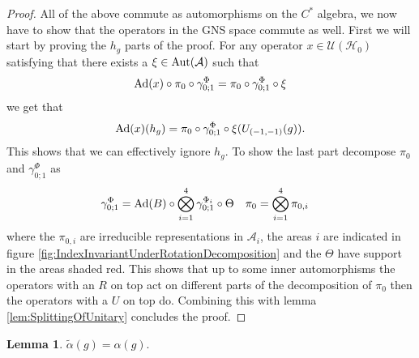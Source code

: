 \documentclass[12pt,a4paper,twoside]{article}
\let\originalleft\left
\let\originalright\right
\renewcommand{\left}{\mathopen{}\mathclose\bgroup\originalleft}
\renewcommand{\right}{\aftergroup\egroup\originalright}
\newcommand{\UU}{\mathcal U}
\newcommand{\HH}{\mathcal H}
\renewcommand{\AA}{\mathcal A}
\newcommand{\Ad}[1]{\textrm{Ad}\left(#1\right)}
\newcommand{\Aut}[1]{\textrm{Aut}\left(#1\right)}
\theoremstyle{definition}
\newtheorem{lemma}[theorem]{Lemma}
\numberwithin{equation}{section}
\begin{document}
\begin{proof}
	All of the above commute as automorphisms on the $C^*$ algebra, we now have to show that the operators in the GNS space commute as well. First we will start by proving the $h_g$ parts of the proof. For any operator $x\in\UU(\HH_0)$ satisfying that there exists a $\xi\in\Aut{\AA}$ such that
	\begin{equation}
		\Ad{x}\circ\pi_0\circ\gamma^{\Phi}_{0;1}=\pi_0\circ\gamma^{\Phi}_{0;1}\circ\xi
	\end{equation}
	we get that
	\begin{equation}
		\Ad{x}(h_g)=\pi_0\circ\gamma^\Phi_{0;1}\circ\xi(U_{(-1,-1)}(g)).
	\end{equation}
	This shows that we can effectively ignore $h_g$. To show the last part decompose $\pi_0$ and $\gamma^\Phi_{0;1}$ as
	\begin{align}
		\gamma^\Phi_{0;1}&=\Ad{B}\circ\bigotimes_{i=1}^4\gamma^{\Phi_i}_{0;1}\circ\Theta&\pi_0&=\bigotimes_{i=1}^4\pi_{0,i}
	\end{align}
	where the $\pi_{0,i}$ are irreducible representations in $\AA_i$, the areas $i$ are indicated in figure \ref{fig:IndexInvariantUnderRotationDecomposition} and the $\Theta$ have support in the areas shaded red. This shows that up to some inner automorphisms the operators with an $R$ on top act on different parts of the decomposition of $\pi_0$ then the operators with a $U$ on top do. Combining this with lemma \ref{lem:SplittingOfUnitary} concludes the proof.
\end{proof}
\begin{lemma}
	$\tilde{\alpha}(g)=\alpha(g)$.
\end{lemma}
\end{document}
